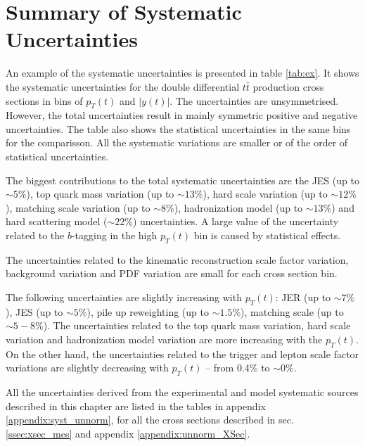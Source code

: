\section{Summary of Systematic Uncertainties}

An example of the systematic uncertainties is presented in table \ref{tab:ex}. It shows the 
systematic uncertainties for the double differential $t\bar{t}$ production cross sections in bins of $p_{T}(t)$ and $|y(t)|$.
The uncertainties are unsymmetrised. However, the total uncertainties result in mainly symmetric positive and negative uncertainties.
The table also shows the statistical uncertainties in the same bins for the comparisson. All the systematic variations are smaller
or of the order of statistical uncertainties.

The biggest contributions to the total systematic uncertainties are the JES (up to $\sim 5\%$), top quark mass variation (up to
$\sim 13\%$), hard scale variation (up to $\sim 12\%$), matching scale variation (up to $\sim 8\%$), hadronization model
(up to $\sim 13\%$) and hard scattering model ($\sim 22\%$) uncertainties. A large value of the uncertainty related to the $b$-tagging 
in the high $p_{T}(t)$ bin is caused by statistical effects.

The uncertainties related to the kinematic reconstruction scale factor variation, background variation and PDF variation are 
small for each cross section bin.

The following uncertainties are slightly increasing with $p_{T}(t)$: JER (up to $\sim 7\%$), JES (up to $\sim 5\%$), pile up
reweighting (up to $\sim 1.5\%$), matching scale (up to $\sim 5-8\%$). The uncertainties related to the top quark mass variation,
hard scale variation and hadronization model variation are more increasing with the $p_{T}(t)$. On the other hand, the uncertainties
related to the trigger and lepton scale factor variations are slightly decreasing with $p_{T}(t)$ -- from 0.4\% to $\sim0\%$.



All the uncertainties derived from the experimental and model systematic sources described in this chapter are listed in the tables in appendix \ref{appendix:syst_unnorm},
for all the cross sections described in sec. \ref{ssec:xsec_mes} and appendix \ref{appendix:unnorm_XSec}. 
% 
% 

